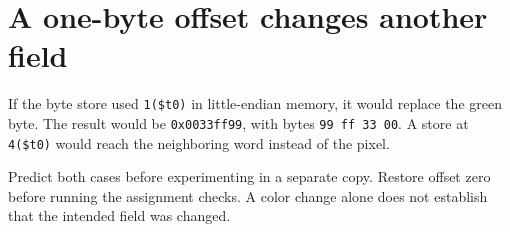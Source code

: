 \section{A one-byte offset changes another
  field}\label{002-single-pixel-x-wrong-offset-a-one-byte-offset-changes-another-field}

If the byte store used \texttt{1(\$t0)} in little-endian memory, it
would replace the green byte. The result would be \texttt{0x0033ff99},
with bytes \texttt{99\ ff\ 33\ 00}. A store at \texttt{4(\$t0)} would
reach the neighboring word instead of the pixel.

Predict both cases before experimenting in a separate copy. Restore
offset zero before running the assignment checks. A color change alone
does not establish that the intended field was changed.
